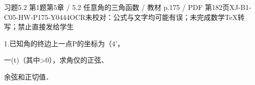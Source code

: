 \begin{bankitem}{习题5.2 第1题}{第5章 / 5.2 任意角的三角函数 / 教材 p.175 / PDF 第182页}{XJ-B1-C05-HW-P175-Y0444}{OCR未校对：公式与文字均可能有误；未完成数学TeX转写；禁止直接发给学生}
\begin{ocrdraft}
\par
1.已知角的终边上一点P的坐标为（4'，
\par
一(t)（其中>0），求角仅的正弦、
\par
余弦和正切值．
\end{ocrdraft}
\end{bankitem}
